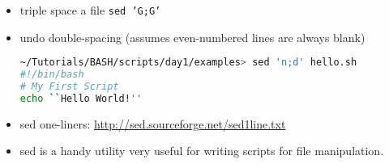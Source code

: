 \documentclass[slidestop,mathserif,compress,xcolor=svgnames]{beamer}
\begin{document}
\begin{frame}
{\begin{itemize}
\begin{lstlisting}[language=bash]
        \end{lstlisting}
      \item triple space a file \texttt{sed 'G;G'}
      \item  undo double-spacing (assumes even-numbered lines are always blank)
        \begin{lstlisting}[language=bash]
~/Tutorials/BASH/scripts/day1/examples> sed 'n;d' hello.sh 
#!/bin/bash
# My First Script
echo ``Hello World!''
        \end{lstlisting}
    \item sed one-liners: \url{http://sed.sourceforge.net/sed1line.txt}
    \item sed is a handy utility very useful for writing scripts for file manipulation.
  \end{itemize}
  }
\end{frame}
\end{document}
